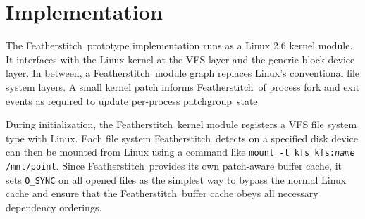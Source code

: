 \documentclass[9pt,twocolumn,letterpaper]{article}
\newcommand{\Kudos}{Featherstitch}
\newcommand{\patch}{patch}
\newcommand{\patches}{patches}
\newcommand{\patchgroup}{patchgroup}
\begin{document}
\begin{comment}
\subsection{Asynchronous writes}
\label{sec:modules:unlink}

Finally, we also wrote a trivial module that removes all dependencies from
incoming \patches, allowing the buffer cache to write blocks in any order.
%
This implements similar semantics to existing file systems like ext2 in
asynchronous write mode.
\end{comment}

\section{Implementation}
\label{sec:implementation}

The \Kudos\ prototype implementation runs as a Linux 2.6 kernel module.
%
%
It interfaces with the Linux kernel at the VFS layer and the generic block
device layer.
%
In between, a \Kudos\ module graph replaces Linux's conventional
file system layers.
%
A small kernel patch informs \Kudos\ of process fork and exit events as
required to update per-process \patchgroup\ state.


During initialization, the \Kudos\ kernel module registers a VFS file system
type with Linux.  %
%
Each file system \Kudos\ detects on a specified disk device can then be mounted
from Linux using a command like \texttt{mount -t kfs kfs:\textit{name}
/mnt/point}.
%
Since \Kudos\ provides its own \patch-aware buffer cache, it sets
\texttt{O\_SYNC} on all opened files as the simplest way to bypass the normal
Linux cache and ensure that the \Kudos\ buffer cache obeys all necessary
dependency orderings.
\end{document}
